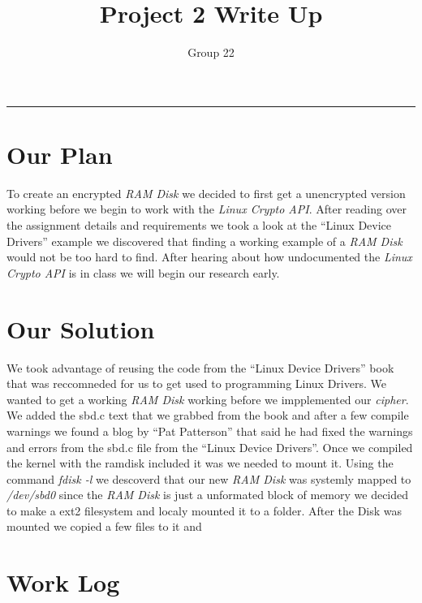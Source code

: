 \documentclass[letterpaper,10pt,notitlepage,fleqn]{article}
\title{Project 2 Write Up}
\author{Group 22}
\begin{document}
\maketitle
\hrule

\section*{Our Plan}
    To create an encrypted \textit{RAM Disk} we decided to first get a unencrypted 
    version working before we begin to work with the \textit{Linux Crypto API}. 
    After reading over the assignment details and requirements we took a look at 
    the ``Linux Device Drivers'' example we discovered that finding a working example 
    of a \textit{RAM Disk} would not be too hard to find. After hearing about how 
    undocumented the \textit{Linux Crypto API} is in class we will begin our research 
    early. 

\section*{Our Solution}
    We took advantage of reusing the code from the ``Linux Device Drivers'' book that 
    was reccomneded for us to get used to programming Linux Drivers. We wanted to get 
    a working \textit{RAM Disk} working before we impplemented our \textit{cipher}. 
    We added the sbd.c text that we grabbed from the book and after a few compile warnings 
    we found a blog by ``Pat Patterson'' that said he had fixed the warnings and errors 
    from the sbd.c file from the ``Linux Device Drivers''. Once we compiled the kernel with 
    the ramdisk included it was we needed to mount it. Using the command \textit{fdisk -l} 
    we descoverd that our new \textit{RAM Disk} was systemly mapped to \textit{/dev/sbd0} 
    since the \textit{RAM Disk} is just a unformated block of memory we decided to make a 
    ext2 filesystem and localy mounted it to a folder. After the Disk was mounted we copied 
    a few files to it and 
\section*{Work Log}
\end{document}
